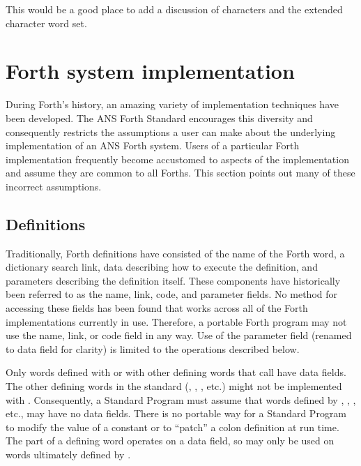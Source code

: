 \begin{editor}
This would be a good place to add a discussion
of characters and the extended character word set.
\end{editor}

\section{Forth system implementation} %

During Forth's history, an amazing variety of implementation techniques
have been developed. The ANS Forth Standard encourages this diversity
and consequently restricts the assumptions a user can make about the
underlying implementation of an ANS Forth system. Users of a particular
Forth implementation frequently become accustomed to aspects of the
implementation and assume they are common to all Forths. This section
points out many of these incorrect assumptions.

\subsection{Definitions} %

Traditionally, Forth definitions have consisted of the name of the
Forth word, a dictionary search link, data describing how to execute
the definition, and parameters describing the definition itself. These
components have historically been referred to as the name, link, code,
and parameter fields.
No method for accessing these fields has been found that works
across all of the Forth implementations currently in use. Therefore,
a portable Forth program may not use the name, link, or code field
in any way. Use of the parameter field (renamed to data field for
clarity) is limited to the operations described below.

Only words defined with  or with other defining words
that call  have data fields. The other defining words
in the standard (, , \word{:}, etc.)
might not be implemented with . Consequently, a Standard
Program must assume that words defined by ,
, \word{:}, etc., may have no data fields. There is no
portable way for a Standard Program to modify the value of a constant or to
``patch'' a colon definition at run time.
The  part of a defining word operates on a data field,
so  may only be used on words ultimately defined by .

